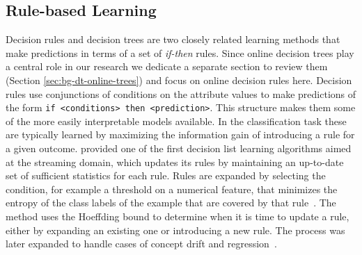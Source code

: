 \subsection*{Rule-based Learning}
Decision rules \cite{decision-lists} and decision trees \cite{breiman1984cart} are two closely related learning methods
that make predictions in terms of a set of \emph{if-then} rules. Since
online decision trees play a central role in our research we dedicate a separate
section to review them (Section \ref{sec:bg-dt-online-trees}) and focus on
online decision rules here. Decision rules use conjunctions of conditions
on the attribute values to make predictions of the form
\texttt{if <conditions> then <prediction>}. This structure makes them
some of the more easily interpretable models available.
In the classification task
these are typically learned by maximizing the information gain
of introducing a rule for a given outcome.
\citet{decision-rules-streams}
provided one of the first decision list learning algorithms aimed at the streaming
domain, which updates its rules by maintaining an up-to-date set of sufficient statistics for each
rule. Rules are expanded by selecting the condition, for example a threshold on
a numerical feature, that minimizes the entropy of the class labels of the example
that are covered by that rule~\cite{decision-rules-streams}.
The method uses the Hoeffding bound \cite{hoeffding-bound} to determine when it is time
to update a rule, either by expanding an existing one or introducing a new rule.
The process was later expanded to handle cases of concept drift \cite{adaptive-rules-classification}
and regression~\cite{adaptive-rules-regression}.


%
%

